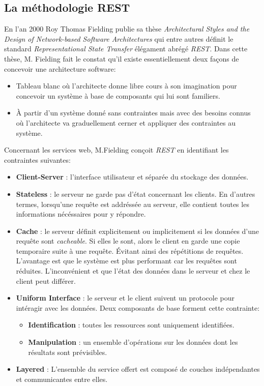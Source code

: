 \subsection{La méthodologie REST}
En l'an 2000 Roy Thomas Fielding publie sa thèse \textit{Architectural Styles and the Design of Network-based Software Architectures} qui entre autres définit le standard \textit{Representational State Transfer} élégament abrégé \textit{REST}. Dans cette thèse, M. Fielding fait le constat qu'il existe essentiellement deux façons de concevoir une architecture software:
\begin{itemize}
    \item Tableau blanc où l'architecte donne libre cours à son imagination pour concevoir un système à base de composants qui lui sont familiers.
    \item À partir d'un système donné sans contraintes mais avec des besoins connus où l'architecte va graduellement cerner et appliquer des contraintes au système.  
\end{itemize}
\smallskip
Concernant les services web, M.Fielding conçoit \textit{REST} en identifiant les contraintes suivantes: 
\smallskip
\begin{itemize}
    \item \textbf{Client-Server} : l'interface utilisateur et séparée du stockage des données.
    \item \textbf{Stateless} : le serveur ne garde pas d'état concernant les clients. En d'autres termes, lorsqu'une requête est addréssée au serveur, elle contient toutes les informations nécéssaires pour y répondre.
    \item \textbf{Cache} : le serveur définit explicitement ou implicitement si les données d'une requête sont \textit{cacheable}. Si elles le sont, alors le client en garde une copie temporaire suite à une requête. Évitant ainsi des répétitions de requêtes. L'avantage est que le système est plus performant car les requêtes sont réduites. L'inconvénient et que l'état des données dans le serveur et chez le client peut différer.
    \item \textbf{Uniform Interface} : le serveur et le client suivent un protocole pour intéragir avec les données. Deux composants de base forment cette contrainte:
    \smallskip
    \begin{itemize}
        \item \textbf{Identification} : toutes les ressources sont uniquement identifiées.
        \item \textbf{Manipulation} : un ensemble d'opérations sur les données dont les résultats sont prévisibles.
    \end{itemize}
    \smallskip
    \item \textbf{Layered} : L'ensemble du service offert est composé de couches indépendantes et communicantes entre elles.
\end{itemize}
\smallskip

